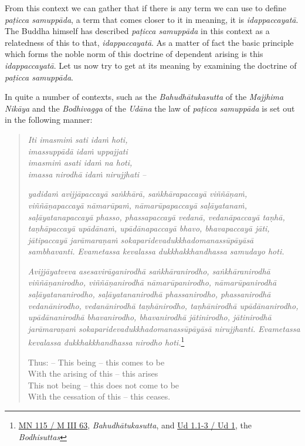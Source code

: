 From this context we can gather that if there is any term we can use to define \emph{paṭicca samuppāda}, a term that comes closer to it in meaning, it is \emph{idappaccayatā}. The Buddha himself has described \emph{paṭicca samuppāda} in this context as a relatedness of this to that, \emph{idappaccayatā}. As a matter of fact the basic principle which forms the noble norm of this doctrine of dependent arising is this \emph{idappaccayatā}. Let us now try to get at its meaning by examining the doctrine of \emph{paṭicca samuppāda}.

In quite a number of contexts, such as the \emph{Bahudhātukasutta} of the \emph{Majjhima Nikāya} and the \emph{Bodhivagga} of the \emph{Udāna} the law of \emph{paṭicca samuppāda} is set out in the following manner:

\begin{quote}
\emph{Iti imasmiṁ sati idaṁ hoti,}\\
\emph{imassuppādā idaṁ uppajjati}\\
\emph{imasmiṁ asati idaṁ na hoti,}\\
\emph{imassa nirodhā idaṁ nirujjhati --}

\emph{yadidaṁ avijjāpaccayā saṅkhārā, saṅkhārapaccayā viññāṇaṁ, viññāṇapaccayā nāmarūpaṁ, nāmarūpapaccayā saḷāyatanaṁ, saḷāyatanapaccayā phasso, phassapaccayā vedanā, vedanāpaccayā taṇhā, taṇhāpaccayā upādānaṁ, upādānapaccayā bhavo, bhavapaccayā jāti, jātipaccayā jarāmaraṇaṁ sokaparidevadukkhadomanassūpāyāsā sambhavanti. Evametassa kevalassa dukkhakkhandhassa samudayo hoti.}

\emph{Avijjāyatveva asesavirāganirodhā saṅkhāranirodho, saṅkhāranirodhā viññāṇanirodho, viññāṇanirodhā nāmarūpanirodho, nāmarūpanirodhā saḷāyatananirodho, saḷāyatananirodhā phassanirodho, phassanirodhā vedanānirodho, vedanānirodhā taṇhānirodho, taṇhānirodhā upādānanirodho, upādānanirodhā bhavanirodho, bhavanirodhā jātinirodho, jātinirodhā jarāmaraṇaṁ sokaparidevadukkhadomanassūpāyāsā nirujjhanti. Evametassa kevalassa dukkhakkhandhassa nirodho hoti.}\footnote{\href{https://suttacentral.net/mn115/pli/ms}{MN 115 / M III 63}, \emph{Bahudhātukasutta}, and \href{https://suttacentral.net/ud1.1/pli/ms}{Ud 1.1-3 / Ud 1}, the \emph{Bodhisuttas}}

Thus: -- This being -- this comes to be\\
With the arising of this -- this arises\\
This not being -- this does not come to be\\
With the cessation of this -- this ceases.


\end{quote}
